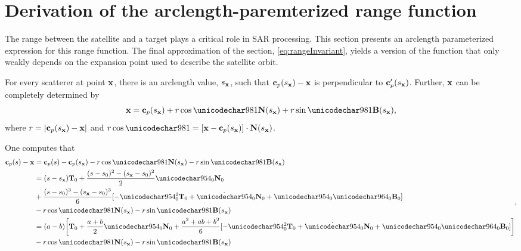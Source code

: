 \section{Derivation of the arclength-paremterized range function}
\label{an:rangeComputation}
The range between the satellite and a target plays a critical role in SAR processing. This section presents an arclength parameterized expression for this range function. The final approximation of the section, \eqref{eq:rangeInvariant}, yields a version of the function that only weakly depends on the expansion point used to describe the satellite orbit.
\par
For every scatterer at point $\mathbf{\mathbf{x}}$, there is an arclength value, $s_{\mathbf{x}}$, such that $\mathbf{c}_p(s_{\mathbf{x}}) - \mathbf{\mathbf{x}}$ is perpendicular to $\mathbf{c}_p'(s_{\mathbf{x}})$. Further, $\mathbf{\mathbf{x}}$ can be completely determined by 
\begin{equation}
 \vct\target = \satp(\targetxparm) + \targetrange\cos\targetdepression\vct{N}(\targetxparm) + \targetrange\sin\targetdepression\vct{B}(\targetxparm),
\end{equation}
where $r=\lvert\mathbf{c}_p(s_{\mathbf{x}})-\mathbf{\mathbf{x}}\rvert$ and $\targetrange\cos\targetdepression = [\vct\target - \satp(\targetxparm)]\cdot\vct{N}(\targetxparm)$.
\par
One computes that
\begin{equation}
\begin{split}
 \satp(\parm)-\vct\target &= \satp(\parm) - \satp(\targetxparm) - \targetrange\cos\targetdepression\vct{N}(\targetxparm) - \targetrange\sin\targetdepression\vct{B}(\targetxparm)\\
 &= (\parm-\targetxparm)\vct{T}_0 + \frac{(\parm-\parm_0)^2 - (\targetxparm - \parm_0)^2}{2}\kappa_0\vct{N}_0\\
 &+\frac{(\parm-\parm_0)^3 - (\targetxparm - \parm_0)^3}{6}[-\kappa^2_0\vct{T}_0 + \dot{\kappa}_0\vct{N}_0 + \kappa_0\tau_0\vct{B}_0]\\
 &- \targetrange\cos\targetdepression\vct{N}(\targetxparm) - \targetrange\sin\targetdepression\vct{B}(\targetxparm)\\
 &= (a-b)\biggl[\vct{T}_0 + \frac{a+b}{2}\kappa_0\vct{N}_0 +\frac{a^2+ab+b^2}{6}[-\kappa^2_0\vct{T}_0 + \dot{\kappa}_0\vct{N}_0 + \kappa_0\tau_0\vct{B}_0]\biggr]\\
 &- \targetrange\cos\targetdepression\vct{N}(\targetxparm) - \targetrange\sin\targetdepression\vct{B}(\targetxparm)
 \end{split},
\end{equation}
